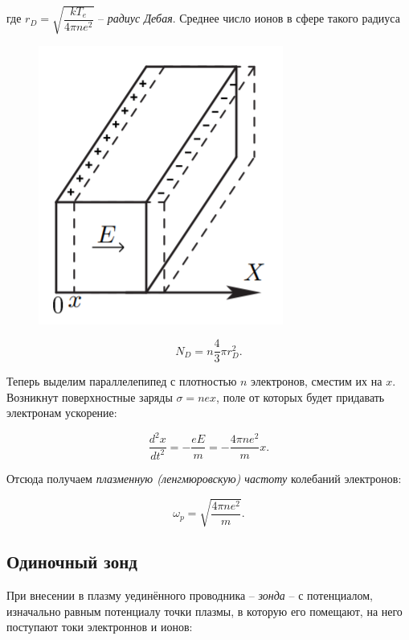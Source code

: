 \documentclass[a4paper, 12pt]{article}
\begin{document}
            где $r_D = \sqrt{\dfrac{kT_e}{4\pi n e^2}}$ -- \textit{радиус Дебая}. Среднее число ионов в сфере такого радиуса

            \begin{figure}
                \includegraphics[scale=0.5]{img/2.png}
            \end{figure}

            \begin{equation}
                N_D = n\dfrac{4}{3}\pi r_D^2.
            \end{equation}

            Теперь выделим параллелепипед с плотностью $n$ электронов, сместим их на $x$. Возникнут поверхностные заряды $\sigma = nex$, поле от которых будет придавать электронам ускорение:

            $$
                \dfrac{d^2x}{dt^2}=-\dfrac{eE}{m}=-\dfrac{4\pi n e^2}{m}x.
            $$

            Отсюда получаем \textit{плазменную (ленгмюровскую) частоту} колебаний электронов:

            \begin{equation}
                \omega_p = \sqrt{\dfrac{4\pi ne^2}{m}}.
            \end{equation}

        \subsection*{Одиночный зонд}

            При внесении в плазму уединённого проводника -- \textit{зонда} -- с потенциалом, изначально равным потенциалу точки плазмы, в которую его помещают, на него поступают токи электроннов и ионов:
\end{document}

